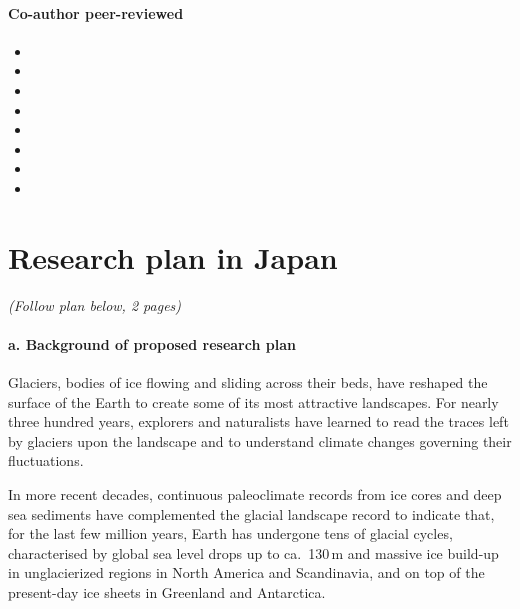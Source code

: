 \documentclass{article}
\begin{document}
\paragraph{Co-author peer-reviewed}

    \begin{itemize}
      \item{}
      \item{}
      \item{}
      \item{}
      \item{}
      \item{}
      \item{}
      \item{}
    \end{itemize}


\section{Research plan in Japan}

    \emph{(Follow plan below, 2 pages)}

\paragraph{a. Background of proposed research plan}

    Glaciers, bodies of ice flowing and sliding across their beds, have
    reshaped the surface of the Earth to create some of its most attractive
    landscapes. For nearly three hundred years, explorers and naturalists have
    learned to read the traces left by glaciers upon the landscape and to
    understand climate changes governing their fluctuations.

    In more recent decades, continuous paleoclimate records from ice cores and
    deep sea sediments have complemented the glacial landscape record to
    indicate that, for the last few million years, Earth has undergone tens of
    glacial cycles, characterised by global sea level drops up to ca.~130\,m
    and massive ice build-up in unglacierized regions in North America and
    Scandinavia, and on top of the present-day ice sheets in Greenland and
    Antarctica.
\end{document}
